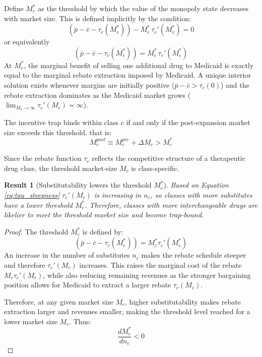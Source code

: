 \documentclass[12pt]{article}
\newtheorem{result}{Result}
\begin{document}
Define $M_c^*$ as the threshold by which the value of the monopoly state decreases with market size. This is defined implicitly by the condition:
\begin{equation} \label{eq:dVM_threshold}
    (\bar{p} - \bar{c} - \tau_c(M_c^*)) - M_c^* \, \tau_c'(M_c^*) = 0
\end{equation}
or equivalently
\begin{equation} \label{eq:threshold}
    (\bar{p} - \bar{c} - \tau_c(M_c^*)) = M_c^* \, \tau_c'(M_c^*)
\end{equation}
At $M_c^*$, the marginal benefit of selling one additional drug to Medicaid is exactly equal to the marginal rebate extraction imposed by Medicaid. A unique interior solution exists whenever margins are initially positive ($\bar{p} - \bar{c} > \tau_c(0)$) and the rebate extraction dominates as the Medicaid market grows ($\lim_{M_c \to \infty} \tau_c'(M_c) = \infty$).

The incentive trap binds within class $c$ if and only if the post-expansion market size exceeds this threshold, that is:
\begin{equation} \label{eq:trap_condition}
    M_c^{post} \equiv M_c^{pre} + \Delta M_c > M_c^*
\end{equation}

Since the rebate function $\tau_c$ reflects the competitive structure of a therapeutic drug class, the threshold market-size $M_c$ is class-specific.

\begin{result}[Substitutability lowers the threshold $M^*_c$] \label{res:subs}
Based on Equation \ref{eq:tau_steepness} $\tau_c'(M_c)$ is increasing in $n_c$, so classes with more substitutes have a lower threshold $M_c^*$. Therefore, classes with more interchangeable drugs are likelier to meet the threshold market size and become trap-bound.
\end{result}

\begin{proof}
The threshold $M_c^*$ is defined by:
\[
(\bar{p} - \bar{c} - \tau_c(M_c^*)) = M_c^* \tau_c'(M_c^*)
\]
An increase in the number of substitutes $n_c$ makes the rebate schedule steeper and therefore $\tau_c'(M_c)$ increases. This raises the marginal cost of the rebate $M_c \tau_c'(M_c)$, while also reducing remaining revenues as the stronger bargaining position allows for Medicaid to extract a larger rebate $\tau_c(M_c)$.

Therefore, at any given market size $M_c$, higher substitutability makes rebate extraction larger and revenues smaller, making the threshold level reached for a lower market size $M_c$. Thus:
\[
\frac{dM_c^*}{dn_c} < 0
\]
\end{proof}
\end{document}
